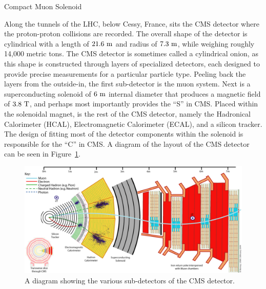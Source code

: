 \begin{section}{Compact Muon Solenoid}

Along the tunnels of the LHC, below Cessy, France, sits the CMS detector where the proton-proton collisions are recorded.
The overall shape of the detector is cylindrical with a length of $21.6~\mathrm{m}$ and radius of $7.3~\mathrm{m}$, while weighing roughly 14,000 metric tons.  
The CMS detector is sometimes called a cylindrical onion, as this shape is constructed through layers of specialized detectors, each designed to provide precise measurements for a particular particle type.
Peeling back the layers from the outside-in, the first sub-detector is the muon system. 
Next is a superconducting solenoid of $6~\mathrm{m}$ internal diameter that produces a magnetic field of $3.8~\mathrm{T}$, and perhaps most importantly provides the ``S'' in CMS.
Placed within the solenoidal magnet, is the rest of the CMS detector, namely the Hadronical Calorimeter (HCAL), Electromagnetic Calorimeter (ECAL), and a silicon tracker.
The design of fitting most of the detector components within the solenoid is responsible for the ``C'' in CMS.
A diagram of the layout of the CMS detector can be seen in Figure~\ref{fig:cms_detector}.

\begin{figure}[tbp!]
\begin{center}
\includegraphics[angle=0,width=0.80\columnwidth]{fig/cms_detector.jpg}
\end{center}
\caption{A diagram showing the various sub-detectors of the CMS detector.~\cite{10.1088/978-1-6817-4078-2ch4}}
\label{fig:cms_detector}
\end{figure}


\end{section}
